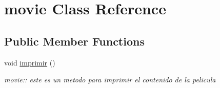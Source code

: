\hypertarget{classmovie}{}\section{movie Class Reference}
\label{classmovie}
\subsection*{Public Member Functions}
\begin{DoxyCompactItemize}
\item 
\mbox{\label{classmovie_a30c8909d370740d43cc61709d0c8800a}} 
void \hyperlink{classmovie_a30c8909d370740d43cc61709d0c8800a}{imprimir} ()
\begin{DoxyCompactList}\small\item\em movie\+:\+: este es un metodo para imprimir el contenido de la pelicula \end{DoxyCompactList}\end{DoxyCompactItemize}
